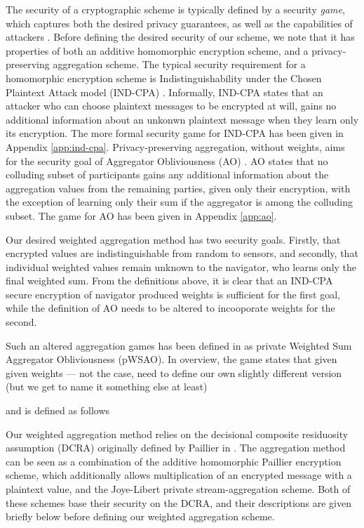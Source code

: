 \documentclass[twocolumn]{autart}    %
\begin{document}
The security of a cryptographic scheme is typically defined by a security \textit{game}, which captures both the desired privacy guarantees, as well as the capabilities of attackers \cite{katzIntroductionModernCryptography2008}. Before defining the desired security of our scheme, we note that it has properties of both an additive homomorphic encryption scheme, and a privacy-preserving aggregation scheme. The typical security requirement for a homomorphic encryption scheme is Indistinguishability under the Chosen Plaintext Attack model (IND-CPA) \cite{}. Informally, IND-CPA states that an attacker who can choose plaintext messages to be encrypted at will, gains no additional information about an unkonwn plaintext message when they learn only its encryption. The more formal security game for IND-CPA has been given in Appendix \ref{app:ind-cpa}. Privacy-preserving aggregation, without weights, aims for the security goal of Aggregator Obliviousness (AO) \cite{}. AO states that no colluding subset of participants gains any additional information about the aggregation values from the remaining parties, given only their encryption, with the exception of learning only their sum if the aggregator is among the colluding subset. The game for AO has been given in Appendix \ref{app:ao}.

Our desired weighted aggregation method has two security goals. Firstly, that encrypted values are indistinguishable from random to sensors, and secondly, that individual weighted values remain unknown to the navigator, who learns only the final weighted sum. From the definitions above, it is clear that an IND-CPA secure encryption of navigator produced weights is sufficient for the first goal, while the definition of AO needs to be altered to incooporate weights for the second.

Such an altered aggregation games has been defined in \cite{alexandruEncryptedCooperativeControl2019} as private Weighted Sum Aggregator Obliviousness (pWSAO). In overview, the game states that given given weights --- not the case, need to define our own slightly different version (but we get to name it something else at least)

and is defined as follows




Our weighted aggregation method relies on the decisional composite residuosity assumption (DCRA) originally defined by Paillier in \cite{paillierPublicKeyCryptosystemsBased1999}. The aggregation method can be seen as a combination of the additive homomorphic Paillier encryption scheme, which additionally allows multiplication of an encrypted message with a plaintext value, and the Joye-Libert private stream-aggregation scheme. Both of these schemes base their security on the DCRA, and their descriptions are given briefly below before defining our weighted aggregation scheme.
\end{document}
